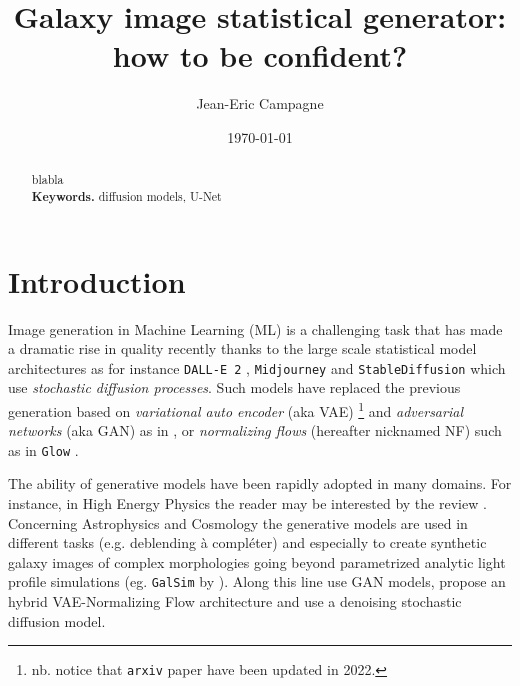 \documentclass[11pt]{amsart}
\title{Galaxy image statistical generator: how to be confident?}
\author{Jean-Eric Campagne}
\date{\today}
\newenvironment{nouppercase}{%
  \let\uppercase\relax%
  \renewcommand{\uppercasenonmath}[1]{}}{}
\begin{document}
\begin{nouppercase}
\maketitle
\end{nouppercase}
%
\begin{abstract}
blabla
\\
\smallskip
\noindent \textbf{Keywords.} diffusion models, U-Net
\end{abstract}

\section{Introduction}
\label{sec:Intro}
Image generation in Machine Learning (ML) is a challenging task that has made a dramatic rise in quality recently thanks to the large scale statistical model architectures as for instance \texttt{DALL-E 2} \citep{ramesh2022}, \texttt{Midjourney} \citep{Oppenlaender2022} and \texttt{StableDiffusion} \citep{Rombach2022} which use \textit{stochastic diffusion processes}. Such models have replaced the previous generation based on \textit{variational auto encoder} (aka VAE) \citep{Kingma2014}\footnote{nb. notice that \texttt{arxiv} paper have been updated in 2022.} and  \textit{adversarial networks} (aka GAN) \citep{goodfellow2014generative} as in \citep[e.g.]{KarrasALL18,brock2018large}, or \textit{normalizing flows} (hereafter nicknamed NF) such as in \texttt{Glow} \citep{Kingma2018}. 


The ability of generative models have been rapidly adopted in many domains. For instance, in High Energy Physics the reader may be interested by the review \cite{PhysRevD.107.076017}. Concerning Astrophysics and Cosmology the generative models are used in different tasks (e.g. deblending \citep{Hemmati_2022,Arcelin2020} {\color{red} à compléter}) and especially to create synthetic galaxy images of complex morphologies going beyond parametrized analytic light profile simulations (eg. \texttt{GalSim} by \cite{ROWE2015121}). Along this line \citep{ravanbakhsh2016,Fussell2019} use GAN models, \cite{Lanusse2021} propose an hybrid VAE-Normalizing Flow architecture and \cite{smith2021} use a denoising stochastic diffusion model. 
\end{document}
